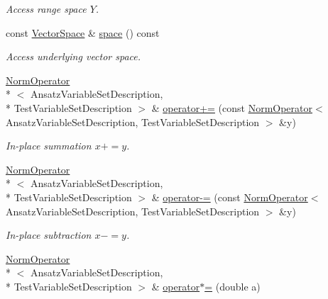 \begin{DoxyCompactItemize}
\begin{DoxyCompactList}\small\item\em Access range space $Y$. \end{DoxyCompactList}\item 
\hypertarget{classSpacy_1_1VectorBase_aa999dbf9d679d895dfe04c10fbf9f5e9}{const \hyperlink{classSpacy_1_1VectorSpace}{Vector\-Space} \& \hyperlink{classSpacy_1_1VectorBase_aa999dbf9d679d895dfe04c10fbf9f5e9}{space} () const }\label{classSpacy_1_1VectorBase_aa999dbf9d679d895dfe04c10fbf9f5e9}

\begin{DoxyCompactList}\small\item\em Access underlying vector space. \end{DoxyCompactList}\item 
\hyperlink{classSpacy_1_1KaskadeParabolic_1_1PDE_1_1NormOperator}{Norm\-Operator}\\*
$<$ Ansatz\-Variable\-Set\-Description, \\*
Test\-Variable\-Set\-Description $>$ \& \hyperlink{classSpacy_1_1AddArithmeticOperators_afad1d01e1e8c6f75290ac46d9b047ea8}{operator+=} (const \hyperlink{classSpacy_1_1KaskadeParabolic_1_1PDE_1_1NormOperator}{Norm\-Operator}$<$ Ansatz\-Variable\-Set\-Description, Test\-Variable\-Set\-Description $>$ \&y)
\begin{DoxyCompactList}\small\item\em In-\/place summation $ x+=y$. \end{DoxyCompactList}\item 
\hyperlink{classSpacy_1_1KaskadeParabolic_1_1PDE_1_1NormOperator}{Norm\-Operator}\\*
$<$ Ansatz\-Variable\-Set\-Description, \\*
Test\-Variable\-Set\-Description $>$ \& \hyperlink{classSpacy_1_1AddArithmeticOperators_a9fa91e177d13203cfe8cfa991c64ca36}{operator-\/=} (const \hyperlink{classSpacy_1_1KaskadeParabolic_1_1PDE_1_1NormOperator}{Norm\-Operator}$<$ Ansatz\-Variable\-Set\-Description, Test\-Variable\-Set\-Description $>$ \&y)
\begin{DoxyCompactList}\small\item\em In-\/place subtraction $ x-=y$. \end{DoxyCompactList}\item 
\hyperlink{classSpacy_1_1KaskadeParabolic_1_1PDE_1_1NormOperator}{Norm\-Operator}\\*
$<$ Ansatz\-Variable\-Set\-Description, \\*
Test\-Variable\-Set\-Description $>$ \& \hyperlink{classSpacy_1_1AddArithmeticOperators_a1d3db95b24fd2bc1de712c9e04c47e2f}{operator$\ast$=} (double a)

\end{DoxyCompactItemize}
